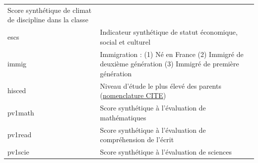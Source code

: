 \documentclass[12pt,twosided, notitlepage]{book}
\begin{document}
\begin{longtable}[]{@{}ll@{}}
\begin{minipage}[t]{0.55\columnwidth}
Score synthétique de climat de discipline dans la classe\strut
\end{minipage}\tabularnewline
\begin{minipage}[t]{0.38\columnwidth}\raggedright\strut
escs\strut
\end{minipage} & \begin{minipage}[t]{0.55\columnwidth}\raggedright\strut
Indicateur synthétique de statut économique, social et culturel\strut
\end{minipage}\tabularnewline
\begin{minipage}[t]{0.38\columnwidth}\raggedright\strut
immig\strut
\end{minipage} & \begin{minipage}[t]{0.55\columnwidth}\raggedright\strut
Immigration : (1) Né en France (2) Immigré de deuxième génération (3)
Immigré de première génération\strut
\end{minipage}\tabularnewline
\begin{minipage}[t]{0.38\columnwidth}\raggedright\strut
hisced\strut
\end{minipage} & \begin{minipage}[t]{0.55\columnwidth}\raggedright\strut
Niveau d'étude le plus élevé des parents
(\href{http://www.uis.unesco.org/Education/Documents/isced-2011-fr.pdf}{nomenclature
CITE})\strut
\end{minipage}\tabularnewline
\begin{minipage}[t]{0.38\columnwidth}\raggedright\strut
pv1math\strut
\end{minipage} & \begin{minipage}[t]{0.55\columnwidth}\raggedright\strut
Score synthétique à l'évaluation de mathématiques\strut
\end{minipage}\tabularnewline
\begin{minipage}[t]{0.38\columnwidth}\raggedright\strut
pv1read\strut
\end{minipage} & \begin{minipage}[t]{0.55\columnwidth}\raggedright\strut
Score synthétique à l'évaluation de compréhension de l'écrit\strut
\end{minipage}\tabularnewline
\begin{minipage}[t]{0.38\columnwidth}\raggedright\strut
pv1scie\strut
\end{minipage} & \begin{minipage}[t]{0.55\columnwidth}\raggedright\strut
Score synthétique à l'évaluation de sciences\strut
\end{minipage}\tabularnewline
\bottomrule
\end{longtable}
\end{document}
